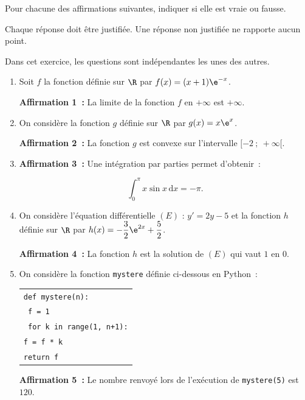 Pour chacune des affirmations suivantes, indiquer si elle est vraie ou fausse.

Chaque réponse doit être justifiée. Une réponse non justifiée ne rapporte aucun point.

Dans cet exercice, les questions sont indépendantes les unes des autres.

\begin{enumerate}
\item Soit $f$ la fonction définie sur $\R$ par $f(x) = (x + 1)\e^{-x}$.

\textbf{Affirmation 1~:} La limite de la fonction $f$ en $+\infty$ est $+\infty$.

\item On considère la fonction $g$ définie sur $\R$ par $g(x) = x\e^x$.

\textbf{Affirmation 2~:} La fonction $g$ est convexe sur l'intervalle $[-2~;~+\infty[$.

\item \textbf{Affirmation 3~:} Une intégration par parties permet d'obtenir~:

\[\displaystyle\int_{0}^{\pi} x\sin x\,\text{d}x = -\pi.\]

\item On considère l'équation différentielle $(E)$ : $y' = 2y - 5$ et la fonction $h$ définie sur $\R$ par $h(x) = -\dfrac{3}{2}\e^{2x} + \dfrac{5}{2}$.

\textbf{Affirmation 4~:} La fonction $h$ est la solution de $(E)$ qui vaut $1$ en $0$.

\item On considère la fonction \texttt{mystere} définie ci-dessous en Python~:

\begin{center}












\begin{tabular}{|l|}\hline
\texttt{def mystere(n):}\\
\quad \texttt{ f = 1}\\
\quad \texttt{ for k in range(1, n+1):}\\
\quad \quad \texttt{f = f * k}\\
\quad  \texttt{return f}\\ \hline
\end{tabular}

\end{center}

\textbf{Affirmation 5~:} Le nombre renvoyé lors de l'exécution de \texttt{mystere(5)} est $120$.
\end{enumerate}
